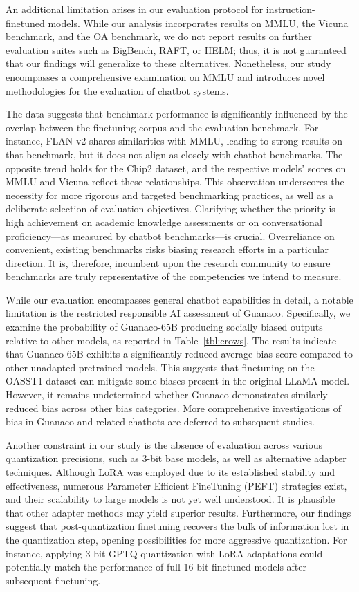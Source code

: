 An additional limitation arises in our evaluation protocol for instruction-finetuned models. While our analysis incorporates results on MMLU, the Vicuna benchmark, and the OA benchmark, we do not report results on further evaluation suites such as BigBench, RAFT, or HELM; thus, it is not guaranteed that our findings will generalize to these alternatives. Nonetheless, our study encompasses a comprehensive examination on MMLU and introduces novel methodologies for the evaluation of chatbot systems.

The data suggests that benchmark performance is significantly influenced by the overlap between the finetuning corpus and the evaluation benchmark. For instance, FLAN v2 shares similarities with MMLU, leading to strong results on that benchmark, but it does not align as closely with chatbot benchmarks. The opposite trend holds for the Chip2 dataset, and the respective models’ scores on MMLU and Vicuna reflect these relationships. This observation underscores the necessity for more rigorous and targeted benchmarking practices, as well as a deliberate selection of evaluation objectives. Clarifying whether the priority is high achievement on academic knowledge assessments or on conversational proficiency—as measured by chatbot benchmarks—is crucial. Overreliance on convenient, existing benchmarks risks biasing research efforts in a particular direction. It is, therefore, incumbent upon the research community to ensure benchmarks are truly representative of the competencies we intend to measure.

While our evaluation encompasses general chatbot capabilities in detail, a notable limitation is the restricted responsible AI assessment of {Guanaco}. Specifically, we examine the probability of {Guanaco}-65B producing socially biased outputs relative to other models, as reported in Table~\ref{tbl:crows}. The results indicate that {Guanaco}-65B exhibits a significantly reduced average bias score compared to other unadapted pretrained models. This suggests that finetuning on the OASST1 dataset can mitigate some biases present in the original LLaMA model. However, it remains undetermined whether {Guanaco} demonstrates similarly reduced bias across other bias categories. More comprehensive investigations of bias in {Guanaco} and related chatbots are deferred to subsequent studies.

Another constraint in our study is the absence of evaluation across various quantization precisions, such as 3-bit base models, as well as alternative adapter techniques. Although LoRA was employed due to its established stability and effectiveness, numerous Parameter Efficient FineTuning (PEFT) strategies exist, and their scalability to large models is not yet well understood. It is plausible that other adapter methods may yield superior results. Furthermore, our findings suggest that post-quantization finetuning recovers the bulk of information lost in the quantization step, opening possibilities for more aggressive quantization. For instance, applying 3-bit GPTQ quantization with LoRA adaptations could potentially match the performance of full 16-bit finetuned models after subsequent finetuning.

